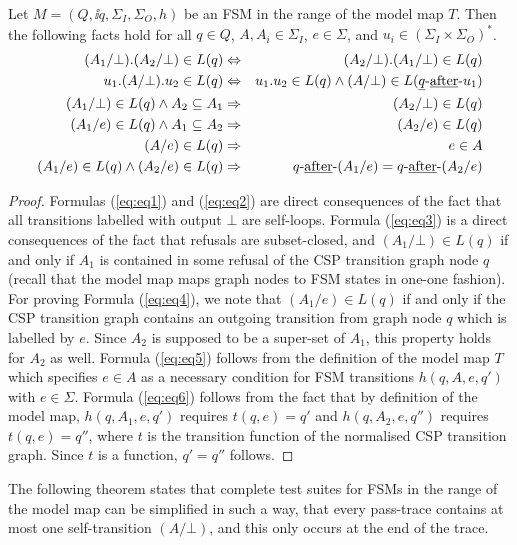 \begin{lemma}\label{lemma:fsmT}
Let $M = (Q,\ii q, \Sigma_I,\Sigma_O,h)$ be an FSM in the range of the model map $T$. 
Then the following facts hold for all $q\in Q$, $A, A_i\in\Sigma_I$, $e\in\Sigma$, and 
$u_i \in (\Sigma_I\times\Sigma_O)^*$.
\begin{eqnarray}
(A_1/\bot).(A_2/\bot)\in L(q) & \Leftrightarrow  &(A_2/\bot).(A_1/\bot)\in L(q)
\label{eq:eq1}
\\
u_1.(A/\bot).u_2\in L(q) & \Leftrightarrow & u_1.u_2\in L(q) \wedge 
(A/\bot)\in L(\underline{q}\text{-\underline{after}-} u_1)
\label{eq:eq2}
\\
(A_1/\bot) \in L(q) \wedge A_2\subseteq A_1 & \Rightarrow & (A_2/\bot) \in L(q)
\label{eq:eq3}
\\
(A_1/e) \in L(q) \wedge A_1\subseteq A_2 & \Rightarrow & (A_2/e) \in L(q)
\label{eq:eq4}
\\
(A/e) \in L(q) & \Rightarrow & e\in A
\label{eq:eq5}
\\
(A_1/e) \in L(q) \wedge (A_2/e) \in L(q) & \Rightarrow & q\text{-\underline{after}-}(A_1/e) = q\text{-\underline{after}-} (A_2/e)
\label{eq:eq6} 
\end{eqnarray}
\end{lemma}
\begin{proof}
Formulas (\ref{eq:eq1}) and (\ref{eq:eq2}) are  direct consequences of the fact that all
transitions labelled with output $\bot$ are self-loops. Formula (\ref{eq:eq3})  is 
a direct consequences of the fact that refusals are subset-closed, and  
$(A_1/\bot) \in L(q)$ if and only if $A_1$ is contained in some refusal of the
CSP transition graph node $q$ (recall that the model map maps graph nodes to FSM states
in one-one fashion). 
For proving Formula (\ref{eq:eq4}), we note that $(A_1/e) \in L(q)$ if and only if
the CSP transition graph contains an outgoing transition from graph node $q$ which is labelled by $e$. Since $A_2$ is supposed to be a super-set of $A_1$, this property holds for $A_2$ as well. Formula (\ref{eq:eq5}) follows from the definition of the 
model map $T$ which specifies $e\in A$ as a necessary condition for FSM transitions $h(q,A,e,q')$ with $e\in \Sigma$.
Formula (\ref{eq:eq6}) follows from the fact that by definition of the model map, 
$h(q,A_1,e,q')$ requires $t(q,e) = q'$ and $h(q,A_2,e,q'')$ requires $t(q,e) = q''$, where $t$ is the transition function of the normalised CSP transition graph. Since $t$ is a function, $q'=q''$ follows.
\end{proof}

The following theorem states that complete test suites for FSMs in the range of the 
model map can be simplified in such a way, that every pass-trace contains at most one
self-transition $(A/\bot)$, and this only occurs at the end of the trace.

